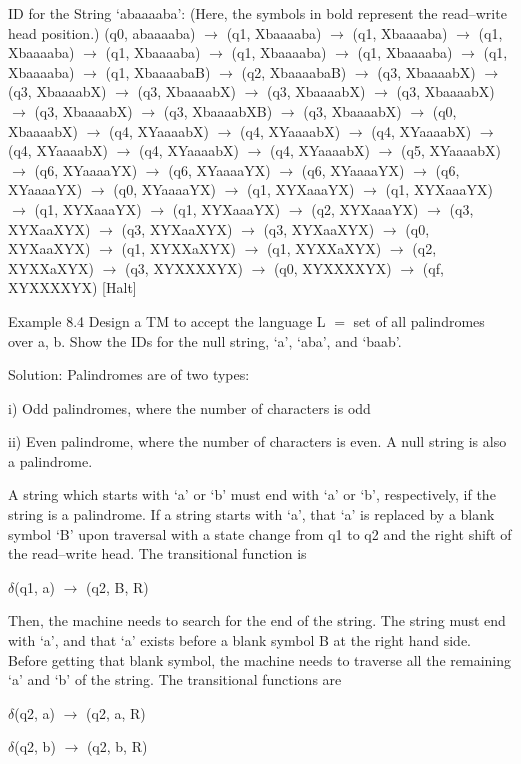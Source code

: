 \documentclass{article}
\begin{document}
ID for the String `abaaaaba': (Here, the symbols in bold represent the
read--write head position.) (q0, abaaaaba) $\to $ (q1, Xbaaaaba) $\to $ (q1,
Xbaaaaba) $\to $ (q1, Xbaaaaba) $\to $ (q1, Xbaaaaba) $\to $ (q1, Xbaaaaba)
$\to $ (q1, Xbaaaaba) $\to $ (q1, Xbaaaaba) $\to $ (q1, XbaaaabaB) $\to $
(q2, XbaaaabaB) $\to $ (q3, XbaaaabX) $\to $ (q3, XbaaaabX) $\to $ (q3,
XbaaaabX) $\to $ (q3, XbaaaabX) $\to $ (q3, XbaaaabX) $\to $ (q3, XbaaaabX)
$\to $ (q3, XbaaaabXB) $\to $ (q3, XbaaaabX) $\to $ (q0, XbaaaabX) $\to $
(q4, XYaaaabX) $\to $ (q4, XYaaaabX) $\to $ (q4, XYaaaabX) $\to $ (q4,
XYaaaabX) $\to $ (q4, XYaaaabX) $\to $ (q4, XYaaaabX) $\to $ (q5, XYaaaabX)
$\to $ (q6, XYaaaaYX) $\to $ (q6, XYaaaaYX) $\to $ (q6, XYaaaaYX) $\to $
(q6, XYaaaaYX) $\to $ (q0, XYaaaaYX) $\to $ (q1, XYXaaaYX) $\to $ (q1,
XYXaaaYX) $\to $ (q1, XYXaaaYX) $\to $ (q1, XYXaaaYX) $\to $ (q2, XYXaaaYX)
$\to $ (q3, XYXaaXYX) $\to $ (q3, XYXaaXYX) $\to $ (q3, XYXaaXYX) $\to $
(q0, XYXaaXYX) $\to $ (q1, XYXXaXYX) $\to $ (q1, XYXXaXYX) $\to $ (q2,
XYXXaXYX) $\to $ (q3, XYXXXXYX) $\to $ (q0, XYXXXXYX) $\to $ (qf, XYXXXXYX)
[Halt]

Example 8.4 Design a TM to accept the language L $=$ \textbraceleft set of
all palindromes over a, b\textbraceright . Show the IDs for the null string,
`a', `aba', and `baab'.

Solution: Palindromes are of two types:

i) Odd palindromes, where the number of characters is odd

ii) Even palindrome, where the number of characters is even. A null string
is also a palindrome.

A string which starts with `a' or `b' must end with `a' or `b',
respectively, if the string is a palindrome. If a string starts with `a',
that `a' is replaced by a blank symbol `B' upon traversal with a state
change from q1 to q2 and the right shift of the read--write head. The
transitional function is

$\delta $(q1, a) $\to $ (q2, B, R)

Then, the machine needs to search for the end of the string. The string must
end with `a', and that `a' exists before a blank symbol B at the right hand
side. Before getting that blank symbol, the machine needs to traverse all
the remaining `a' and `b' of the string. The transitional functions are

$\delta $(q2, a) $\to $ (q2, a, R)

$\delta $(q2, b) $\to $ (q2, b, R)
\end{document}
